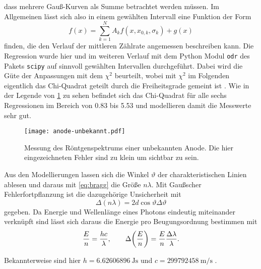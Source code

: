 dass mehrere Gauß-Kurven als Summe betrachtet werden müssen. Im Allgemeinen lässt sich also in einem 
gewählten Intervall eine Funktion der Form 
\begin{equation*}
	f(x) = \sum_{k=1}^N A_kf(x,x_{0,k}, \sigma_k) + g(x)
\end{equation*}
finden, die den Verlauf der mittleren Zählrate angemessen beschreiben kann. Die Regression wurde hier und im weiteren 
Verlauf mit dem Python 
Modul \verb|odr| des Pakets \verb|scipy| auf sinnvoll 
gewählten Intervallen durchgeführt. Dabei wird die Güte der Anpassungen mit dem $\chi^2$ beurteilt, 
wobei mit $\chi^2$ im Folgenden eigentlich das Chi-Quadrat geteilt durch die Freiheitsgrade gemeint ist 
\cite{wiki:reduced_chi_square}. Wie in der Legende von \cref{fig:anode-unbekannt-messung} zu sehen befindet 
sich das Chi-Quadrat für alle sechs Regressionen im Bereich von \num{0.83} bis \num{5.53} und modellieren 
damit die Messwerte sehr gut.\par

\begin{figure}[htb]
	\centering
	\texttt{[image: anode-unbekannt.pdf]}
	\caption{Messung des Röntgenspektrums einer unbekannten Anode. Die hier eingezeichneten Fehler sind zu klein um
	sichtbar zu sein.}
	\label{fig:anode-unbekannt-messung}
\end{figure}

Aus den Modellierungen lassen sich die Winkel $\vartheta$ der charakteristischen Linien ablesen und daraus mit 
\cref{eq:bragg} die Größe $n\lambda$. Mit Gaußscher Fehlerfortpflanzung \cite{wiki:fehlerfortpflanzung}
ist die dazugehörige Unsicherheit mit 
\begin{equation*}
	\Delta(n\lambda) = 2d\cos\vartheta\Delta\vartheta
\end{equation*}
gegeben. Da Energie und Wellenlänge eines Photons eindeutig miteinander verknüpft sind lässt sich daraus 
die Energie pro Beugungsordnung bestimmen mit
\begin{equation}
	\frac{E}{n} = \frac{hc}{\lambda}, \qquad \Delta\qty(\frac{E}{n}) = \frac{E}{n}\frac{\Delta\lambda}{\lambda}.
	\label{eq:energy_photon}
\end{equation}

Bekannterweise sind hier $h=\SI{6.62606896}{\joule\second}$ und $c=\SI{299 792 458}{\meter\per\second}$ 
\cite{Demtröder:829119}.



